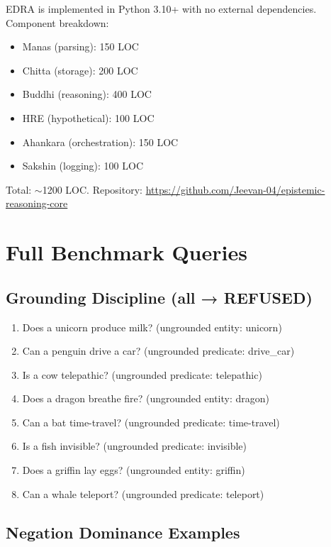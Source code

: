 \documentclass[11pt]{article}
\begin{document}
EDRA is implemented in Python 3.10+ with no external dependencies. Component breakdown:

\begin{itemize}
    \item Manas (parsing): 150 LOC
    \item Chitta (storage): 200 LOC
    \item Buddhi (reasoning): 400 LOC
    \item HRE (hypothetical): 100 LOC
    \item Ahankara (orchestration): 150 LOC
    \item Sakshin (logging): 100 LOC
\end{itemize}

Total: $\sim$1200 LOC. Repository: \url{https://github.com/Jeevan-04/epistemic-reasoning-core}

\section{Full Benchmark Queries}

\subsection{Grounding Discipline (all → REFUSED)}

\begin{enumerate}
    \item Does a unicorn produce milk? (ungrounded entity: unicorn)
    \item Can a penguin drive a car? (ungrounded predicate: drive\_car)
    \item Is a cow telepathic? (ungrounded predicate: telepathic)
    \item Does a dragon breathe fire? (ungrounded entity: dragon)
    \item Can a bat time-travel? (ungrounded predicate: time-travel)
    \item Is a fish invisible? (ungrounded predicate: invisible)
    \item Does a griffin lay eggs? (ungrounded entity: griffin)
    \item Can a whale teleport? (ungrounded predicate: teleport)
\end{enumerate}

\subsection{Negation Dominance Examples}
\end{document}
